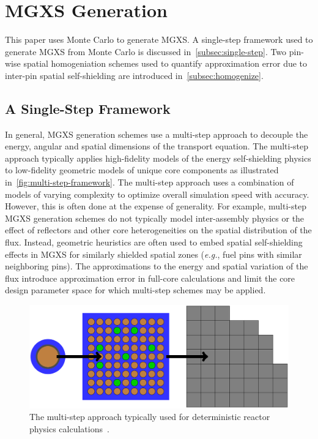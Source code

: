 \section{MGXS Generation}
\label{sec:mgxs-generation}

This paper uses Monte Carlo to generate MGXS. A single-step framework used to generate MGXS from Monte Carlo is discussed in~\autoref{subsec:single-step}. Two pin-wise spatial homogeniation schemes used to quantify approximation error due to inter-pin spatial self-shielding are introduced in~\autoref{subsec:homogenize}.


\subsection{A Single-Step Framework}
\label{subsec:single-step}

In general, MGXS generation schemes use a multi-step approach to decouple the energy, angular and spatial dimensions of the transport equation. The multi-step approach typically applies high-fidelity models of the energy self-shielding physics to low-fidelity geometric models of unique core components as illustrated in~\autoref{fig:multi-step-framework}. The multi-step approach uses a combination of models of varying complexity to optimize overall simulation speed with accuracy. However, this is often done at the expense of generality. For example, multi-step MGXS generation schemes do not typically model inter-assembly physics or the effect of reflectors and other core heterogeneities on the spatial distribution of the flux. Instead, geometric heuristics are often used to embed spatial self-shielding effects in MGXS for similarly shielded spatial zones (\textit{e.g.}, fuel pins with similar neighboring pins). The approximations to the energy and spatial variation of the flux introduce approximation error in full-core calculations and limit the core design parameter space for which multi-step schemes may be applied. 

\begin{figure}[h!]
\centering
\includegraphics[width=\linewidth]{figures/multi-step-flow-chart}
\caption{The multi-step approach typically used for deterministic reactor physics calculations~\citep{gibson2016thesis}.}
\label{fig:multi-step-framework}
\end{figure}

